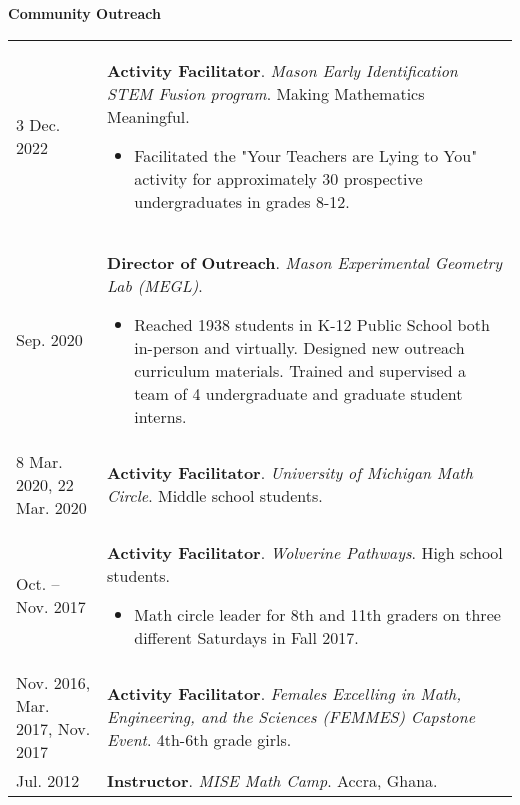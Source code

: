     \vspace{-1em}
    

    \textbf{\large Community Outreach}
    
    \begin{center}
    {
    \renewcommand{\arraystretch}{1.2}
    \begin{longtable}{p{}  p{}}
    3 Dec.  2022 & \textbf{Activity Facilitator}. \textit{Mason Early Identification STEM Fusion program}.  Making Mathematics Meaningful. 
        \hspace{-1em}

        {\small
        \begin{itemize}
        \setlength{\parindent}{0em}
        \item[] Facilitated the "Your Teachers are Lying to You" activity for approximately 30 prospective undergraduates in grades 8-12.
        \end{itemize}
        }
        \vspace{-1em}
         \\ 
 Sep.  2020 & \textbf{Director of Outreach}. \textit{Mason Experimental Geometry Lab (MEGL)}. 
        \hspace{-1em}

        {\small
        \begin{itemize}
        \setlength{\parindent}{0em}
        \item[] Reached 1938 students in K-12 Public School both in-person and virtually. Designed new outreach curriculum materials. Trained and supervised a team of 4 undergraduate and graduate student interns.
        \end{itemize}
        }
        \vspace{-1em}
         \\ 
8 Mar.  2020, 22 Mar.  2020 & \textbf{Activity Facilitator}. \textit{University of Michigan Math Circle}.  Middle school students.  \\ 
 Oct.  --  Nov.  2017 & \textbf{Activity Facilitator}. \textit{Wolverine Pathways}.  High school students. 
        \hspace{-1em}

        {\small
        \begin{itemize}
        \setlength{\parindent}{0em}
        \item[] Math circle leader for 8th and 11th graders on three different Saturdays in Fall 2017.
        \end{itemize}
        }
        \vspace{-1em}
         \\ 
 Nov.  2016,  Mar.  2017,  Nov.  2017 & \textbf{Activity Facilitator}. \textit{Females Excelling in Math, Engineering, and the Sciences (FEMMES) Capstone Event}.  4th-6th grade girls.  \\ 
 Jul.  2012 & \textbf{Instructor}. \textit{MISE Math Camp}.  Accra, Ghana. 
        \hspace{-1em}


\end{longtable}}
\end{center}
